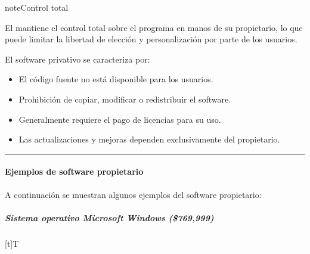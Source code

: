 \documentclass[letterpaper,10pt,spanish]{sphinxmanual}
\let\sphinxpxdimen\pdfpxdimen\else\newdimen\sphinxpxdimen
\begin{document}
\begin{sphinxadmonition}{note}{Control total}

\sphinxAtStartPar
El  mantiene el control total sobre el programa en manos de su propietario, lo que puede limitar la libertad de elección y personalización por parte de los usuarios.
\end{sphinxadmonition}

\sphinxAtStartPar
El software privativo se caracteriza por:
\begin{itemize}
\item {} 
\sphinxAtStartPar
El código fuente no está disponible para los usuarios.

\item {} 
\sphinxAtStartPar
Prohibición de copiar, modificar o redistribuir el software.

\item {} 
\sphinxAtStartPar
Generalmente requiere el pago de licencias para su uso.

\item {} 
\sphinxAtStartPar
Las actualizaciones y mejoras dependen exclusivamente del propietario.

\end{itemize}


\bigskip\hrule\bigskip



\paragraph{Ejemplos de software propietario}
\label{\detokenize{cursos/ofimatica10/recursos/T02:ejemplos-de-software-propietario}}
\sphinxAtStartPar
A continuación se muestran algunos ejemplos del software propietario:


\subparagraph{Sistema operativo Microsoft Windows (\$769,999)}
\label{\detokenize{cursos/ofimatica10/recursos/T02:sistema-operativo-microsoft-windows-769-999}}

\begin{savenotes}\sphinxattablestart
\sphinxthistablewithglobalstyle
\centering
\begin{tabulary}{\linewidth}[t]{T}
\sphinxtoprule
\sphinxtableatstartofbodyhook

\begin{sphinxfigure-in-table}
\centering
\capstart
\noindent\sphinxincludegraphics[width=300\sphinxpxdimen]{{image11}.png}
\label{\detokenize{cursos/ofimatica10/recursos/T02:id43}}\end{sphinxfigure-in-table}\relax
\\
\sphinxbottomrule
\end{tabulary}
\sphinxtableafterendhook\par
\sphinxattableend\end{savenotes}
\end{document}

